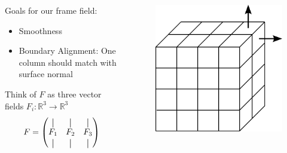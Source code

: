 \documentclass[
	11pt, %
	aspectratio=169, %
]{beamer}
\newcommand*{\vertbar}{\rule[-1ex]{0.5pt}{2.5ex}}
\begin{document}
\begin{frame}
\begin{columns}[c]
		\begin{column}{0.6\textwidth} %
			Goals for our frame field:
			\begin{itemize}
				\item Smoothness
				\item Boundary Alignment: One column should match with surface normal
			\end{itemize}
			Think of $F$ as three vector fields $F_i : \mathbb{R}^3 \to \mathbb{R}^3$
			$$F=\begin{pmatrix}
				\vertbar & \vertbar & \vertbar \\
				F_1 & F_2 & F_3 \\
				\vertbar & \vertbar & \vertbar
			\end{pmatrix}$$
		\end{column}
		\begin{column}{0.35\textwidth} %
			\begin{figure}
				\includegraphics[width=\linewidth]{cube.pdf}
			\end{figure}
		\end{column}
	\end{columns}
\end{frame}
\end{document}
